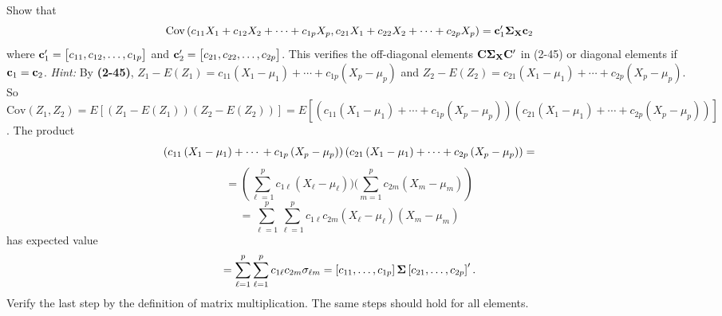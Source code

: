         Show that
        \[
            \text{Cov}\left(c_{11}X_1 + c_{12}X_2 + \cdots + c_{1p}X_p, c_{21}X_1 + c_{22}X_2 + \cdots + c_{2p}X_p\right) = \bold{c}_1^\prime \bold{\Sigma}_\bold{X}\bold{c}_2
        \]
        where $\bold{c}_1^\prime = \begin{bmatrix}
            c_{11}, c_{12}, \dots, c_{1p}
        \end{bmatrix}$ and $\bold{c}_2^\prime = \begin{bmatrix}
            c_{21}, c_{22}, \dots, c_{2p}
        \end{bmatrix}$. This verifies the off-diagonal elements $\bold{C}\bold{\Sigma}_\bold{X}\bold{C}^\prime$ in (2-45) or diagonal elements if $\bold{c}_1 = \bold{c}_2$.
        \newline
        \textit{Hint:} By \textbf{(2-45)}, $Z_1 - E\left(Z_1\right) = c_{11}\left(X_1 - \mu_1\right) + \cdots + c_{1p}\left(X_p - \mu_p\right)$ and $Z_2 - E\left(Z_2\right) = c_{21}\left(X_1 - \mu_1\right) + \cdots + c_{2p}\left(X_p - \mu_p\right)$. So $\text{Cov}\left(Z_1,Z_2\right) = E[(Z_1 - E\left(Z_1\right))(Z_2 - E\left(Z_2\right))] = E[(c_{11}\left(X_1 - \mu_1\right) + \cdots \allowbreak + c_{1p}\left(X_p - \mu_p\right))(c_{21}\left(X_1 - \mu_1\right) + \cdots + c_{2p}\left(X_p - \mu_p\right))]$.
        The product
        \[
                \left(c_{11}\left(X_1 - \mu_1\right) + \cdots \\
                + c_{1p}\left(X_p - \mu_p\right)\right)\left(c_{21}\left(X_1 - \mu_1\right) + \cdots + c_{2p}\left(X_p - \mu_p\right)\right)
                =
        \]
        \[
         =
         \left(\sum_{\ell = 1}^p{c_{1\ell}\left(X_\ell - \mu_\ell\right)}\bigr)\bigl(\sum_{m = 1}^p{c_{2m}\left(X_m - \mu_m\right)}\right)
        \]
        \[
            =
            \sum_{\ell = 1}^p{\sum_{\ell = 1}^p{c_{1\ell}c_{2m}\left(X_\ell - \mu_\ell\right)\left(X_m - \mu_m\right)}}
        \]
        has expected value
        \[
            =
            \sum_{\ell = 1}^p{\sum_{\ell = 1}^p{c_{1\ell}c_{2m}\sigma_{\ell m}}}
            =
            \left[c_{11}, \dots, c_{1p}\right]\bold{\Sigma}\left[c_{21}, \dots, c_{2p}\right]^\prime.
        \]
        Verify the last step by the definition of matrix multiplication. The same steps should hold for all elements.
        \newline
        \par
